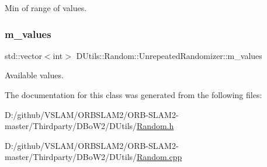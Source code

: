 Min of range of values. 

\mbox{\label{class_d_utils_1_1_random_1_1_unrepeated_randomizer_adbe23146bfc61994e361d356282ce6c4}} 
\subsubsection{\texorpdfstring{m\+\_\+values}{m\_values}}
{\footnotesize\ttfamily std\+::vector$<$int$>$ D\+Utils\+::\+Random\+::\+Unrepeated\+Randomizer\+::m\+\_\+values\hspace{0.3cm}{\ttfamily [protected]}}



Available values. 



The documentation for this class was generated from the following files\+:\begin{DoxyCompactItemize}
\item 
D\+:/github/\+V\+S\+L\+A\+M/\+O\+R\+B\+S\+L\+A\+M2/\+O\+R\+B-\/\+S\+L\+A\+M2-\/master/\+Thirdparty/\+D\+Bo\+W2/\+D\+Utils/\mbox{\hyperlink{_random_8h}{Random.\+h}}\item 
D\+:/github/\+V\+S\+L\+A\+M/\+O\+R\+B\+S\+L\+A\+M2/\+O\+R\+B-\/\+S\+L\+A\+M2-\/master/\+Thirdparty/\+D\+Bo\+W2/\+D\+Utils/\mbox{\hyperlink{_random_8cpp}{Random.\+cpp}}\end{DoxyCompactItemize}
